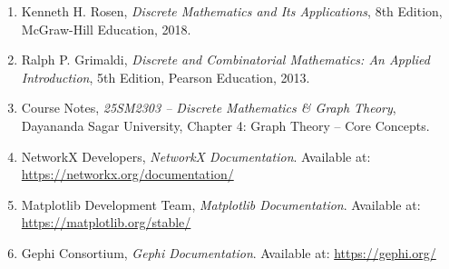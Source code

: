 \documentclass[12pt,a4paper]{article}
\begin{document}
\begin{enumerate}

\item Kenneth H. Rosen, \textit{Discrete Mathematics and Its
Applications}, 8th Edition, McGraw-Hill Education, 2018.

\item Ralph P. Grimaldi, \textit{Discrete and Combinatorial
Mathematics: An Applied Introduction}, 5th Edition,
Pearson Education, 2013.

\item Course Notes, \textit{25SM2303 -- Discrete Mathematics
\& Graph Theory}, Dayananda Sagar University,
Chapter 4: Graph Theory -- Core Concepts.

\item NetworkX Developers, \textit{NetworkX Documentation}.
Available at: \url{https://networkx.org/documentation/}

\item Matplotlib Development Team, \textit{Matplotlib
Documentation}. Available at:
\url{https://matplotlib.org/stable/}

\item Gephi Consortium, \textit{Gephi Documentation}.
Available at: \url{https://gephi.org/}

\end{enumerate}
\end{document}
